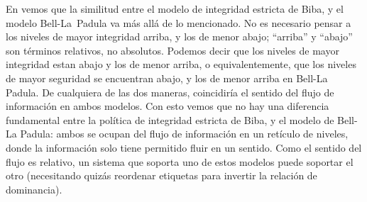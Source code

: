 \documentclass[spanish]{article}
\theoremstyle{definition}
\begin{document}
En \cite{Sandhu93} vemos que la similitud entre el modelo de integridad estricta
de Biba, y el modelo Bell-La~Padula va más allá de lo mencionado. No es
necesario pensar a los niveles de mayor integridad arriba, y los de menor abajo;
``arriba'' y ``abajo'' son términos relativos, no absolutos. Podemos decir que
los niveles de mayor integridad estan abajo y los de menor arriba, o
equivalentemente, que los niveles de mayor seguridad se encuentran abajo, y los
de menor arriba en Bell-La Padula. De cualquiera de las dos maneras,
coincidiría el sentido del flujo de información en ambos modelos. Con esto vemos
que no hay una diferencia fundamental entre la política de integridad estricta
de Biba, y el modelo de Bell-La Padula: ambos se ocupan del flujo de información
en un retículo de niveles, donde la información solo tiene permitido fluir en un
sentido. Como el sentido del flujo es relativo, un sistema que soporta uno de
estos modelos puede soportar el otro (necesitando quizás reordenar etiquetas
para invertir la relación de dominancia).



\end{document}
